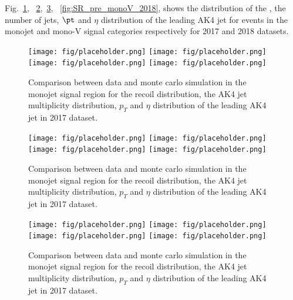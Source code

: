 Fig.~\ref{fig:SR_pre_monojet_2017}, ~\ref{fig:SR_pre_monoV_2017},~\ref{fig:SR_pre_monojet_2018}, ~\ref{fig:SR_pre_monoV_2018},
shows the distribution of the \ETmiss, the number of
jets, $\pt$ and $\eta$ distribution of the leading AK4 jet for events
in the monojet and mono-V signal categories respectively for 2017 and 2018 datasets.

\begin{figure}[htbp]
    \begin{center}
        \texttt{[image: fig/placeholder.png]}
        \texttt{[image: fig/placeholder.png]} \\
        \texttt{[image: fig/placeholder.png]}
        \texttt{[image: fig/placeholder.png]}
    \end{center}
    \caption{Comparison between data and monte carlo simulation in the monojet signal region for
        the recoil distribution, the AK4 jet multiplicity distribution,  $p_T$ and $\eta$
        distribution of the leading AK4  jet in 2017 dataset.}
    \label{fig:SR_pre_monojet_2017}
\end{figure}

\begin{figure}[htbp]
    \begin{center}
        \texttt{[image: fig/placeholder.png]}
        \texttt{[image: fig/placeholder.png]} \\
        \texttt{[image: fig/placeholder.png]}
        \texttt{[image: fig/placeholder.png]}
    \end{center}
    \caption{Comparison between data and monte carlo simulation in the monojet signal region for
        the recoil distribution, the AK4 jet multiplicity distribution,  $p_T$ and $\eta$
        distribution of the leading AK4  jet in 2017 dataset.}
    \label{fig:SR_pre_monoV_2017}
\end{figure}

\begin{figure}[htbp]
    \begin{center}
        \texttt{[image: fig/placeholder.png]}
        \texttt{[image: fig/placeholder.png]} \\
        \texttt{[image: fig/placeholder.png]}
        \texttt{[image: fig/placeholder.png]}
    \end{center}
    \caption{Comparison between data and monte carlo simulation in the monojet signal region for
        the recoil distribution, the AK4 jet multiplicity distribution,  $p_T$ and $\eta$
        distribution of the leading AK4  jet in 2017 dataset.}
    \label{fig:SR_pre_monojet_2018}
\end{figure}

